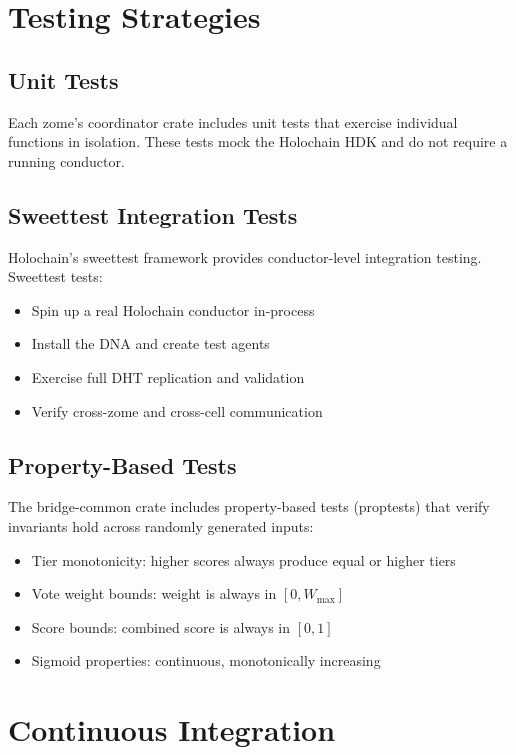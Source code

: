 \documentclass[12pt]{book}
\begin{document}
\section{Testing Strategies}

\subsection{Unit Tests}

Each zome's coordinator crate includes unit tests that exercise individual
functions in isolation. These tests mock the Holochain HDK and do not require
a running conductor.

\subsection{Sweettest Integration Tests}

Holochain's sweettest framework provides conductor-level integration testing.
Sweettest tests:
\begin{itemize}
  \item Spin up a real Holochain conductor in-process
  \item Install the DNA and create test agents
  \item Exercise full DHT replication and validation
  \item Verify cross-zome and cross-cell communication
\end{itemize}

\subsection{Property-Based Tests}

The bridge-common crate includes property-based tests (proptests) that verify
invariants hold across randomly generated inputs:

\begin{itemize}
  \item Tier monotonicity: higher scores always produce equal or higher tiers
  \item Vote weight bounds: weight is always in $[0, W_{\max}]$
  \item Score bounds: combined score is always in $[0, 1]$
  \item Sigmoid properties: continuous, monotonically increasing
\end{itemize}

\section{Continuous Integration}
\end{document}
